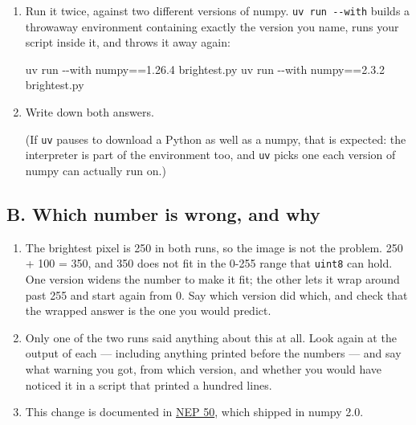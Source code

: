 \documentclass[
  letterpaper,
  DIV=11,
  numbers=noendperiod]{scrartcl}
\newenvironment{Shaded}{\begin{snugshade}}{\end{snugshade}}
\newcommand{\AttributeTok}[1]{\textcolor[rgb]{0.40,0.45,0.13}{#1}}
\newcommand{\BuiltInTok}[1]{\textcolor[rgb]{0.00,0.23,0.31}{#1}}
\newcommand{\ExtensionTok}[1]{\textcolor[rgb]{0.00,0.23,0.31}{#1}}
\newcommand{\NormalTok}[1]{\textcolor[rgb]{0.00,0.23,0.31}{#1}}
\newcommand{\StringTok}[1]{\textcolor[rgb]{0.13,0.47,0.30}{#1}}
\begin{document}
\begin{enumerate}
\begin{Shaded}
\begin{Highlighting}[]
\BuiltInTok{print}\NormalTok{(}\StringTok{"numpy"}\NormalTok{, np.\_\_version\_\_)}
\BuiltInTok{print}\NormalTok{(}\StringTok{"brightest pixel:"}\NormalTok{, peak)}
\BuiltInTok{print}\NormalTok{(}\StringTok{"after offset:   "}\NormalTok{, corrected)}
\end{Highlighting}
\end{Shaded}
\item
  Run it twice, against two different versions of numpy.
  \texttt{uv\ run\ -\/-with} builds a throwaway environment containing
  exactly the version you name, runs your script inside it, and throws
  it away again:

\begin{Shaded}
\begin{Highlighting}[]
\ExtensionTok{uv}\NormalTok{ run }\AttributeTok{{-}{-}with} \StringTok{\textquotesingle{}numpy==1.26.4\textquotesingle{}}\NormalTok{ brightest.py}
\ExtensionTok{uv}\NormalTok{ run }\AttributeTok{{-}{-}with} \StringTok{\textquotesingle{}numpy==2.3.2\textquotesingle{}}\NormalTok{  brightest.py}
\end{Highlighting}
\end{Shaded}
\item
  Write down both answers.

  (If \texttt{uv} pauses to download a Python as well as a numpy, that
  is expected: the interpreter is part of the environment too, and
  \texttt{uv} picks one each version of numpy can actually run on.)
\end{enumerate}

\subsection{B. Which number is wrong, and
why}\label{b.-which-number-is-wrong-and-why}

\begin{enumerate}
\def\labelenumi{\roman{enumi}.}
\item
  The brightest pixel is 250 in both runs, so the image is not the
  problem. 250 + 100 = 350, and 350 does not fit in the 0-255 range that
  \texttt{uint8} can hold. One version widens the number to make it fit;
  the other lets it wrap around past 255 and start again from 0. Say
  which version did which, and check that the wrapped answer is the one
  you would predict.
\item
  Only one of the two runs said anything about this at all. Look again
  at the output of each --- including anything printed before the
  numbers --- and say what warning you got, from which version, and
  whether you would have noticed it in a script that printed a hundred
  lines.
\item
  This change is documented in
  \href{https://numpy.org/neps/nep-0050-scalar-promotion.html}{NEP 50},
  which shipped in numpy 2.0.
\end{enumerate}
\end{document}
